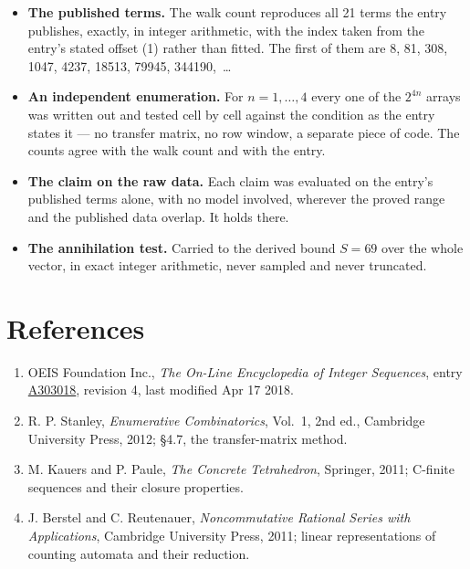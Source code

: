 \documentclass[11pt]{article}
\theoremstyle{definition}
\begin{document}
\begin{itemize}

\item {\bfseries The published terms.} The walk count reproduces all 21 terms the entry publishes, exactly, in integer arithmetic, with the index taken from the entry's stated offset (1) rather than fitted. The first of them are 8, 81, 308, 1047, 4237, 18513, 79945, 344190,~\dots

\item {\bfseries An independent enumeration.} For $n = 1,\dots,4$ every one of the $2^{4n}$ arrays was written out and tested cell by cell against the condition as the entry states it --- no transfer matrix, no row window, a separate piece of code. The counts agree with the walk count and with the entry.

\item {\bfseries The claim on the raw data.} Each claim was evaluated on the entry's published terms alone, with no model involved, wherever the proved range and the published data overlap. It holds there.

\item {\bfseries The annihilation test.} Carried to the derived bound $S = 69$ over the whole vector, in exact integer arithmetic, never sampled and never truncated.

\end{itemize}

\section{References}

\begin{enumerate}

\item OEIS Foundation Inc., \emph{The On-Line Encyclopedia of Integer Sequences}, entry \href{https://oeis.org/A303018}{A303018}, revision 4, last modified Apr 17 2018.

\item R. P. Stanley, \emph{Enumerative Combinatorics}, Vol.~1, 2nd ed., Cambridge University Press, 2012; \S4.7, the transfer-matrix method.

\item M. Kauers and P. Paule, \emph{The Concrete Tetrahedron}, Springer, 2011; C-finite sequences and their closure properties.

\item J. Berstel and C. Reutenauer, \emph{Noncommutative Rational Series with Applications}, Cambridge University Press, 2011; linear representations of counting automata and their reduction.

\end{enumerate}
\end{document}
